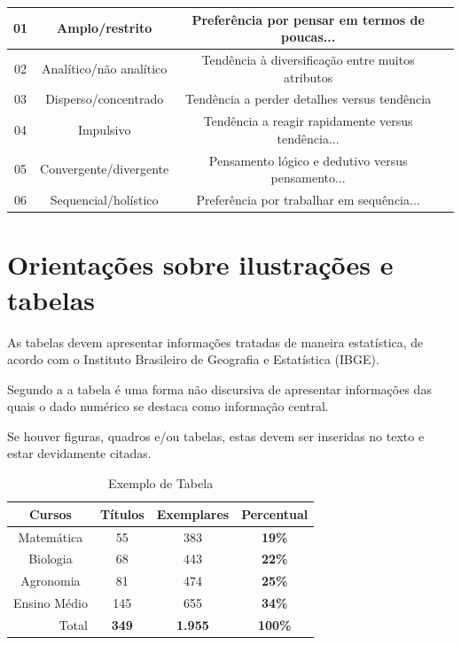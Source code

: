 \begin{quadro}[htb]

{
\caption{\label{quadro_exemplo}Estilos cognitivos propostos por psicólogos.}
}
 \begin{tabular}{|c|c|c|c|}

 \hline
 \rowcolor[HTML]{D2DFEC} 
 \textbf{01} & \textbf{Amplo/restrito} & \textbf{Preferência por pensar em termos de poucas...} \\
 \hline
 \rowcolor[HTML]{A7BDDE} 
 02 & Analítico/não analítico & Tendência à diversificação entre muitos atributos \\ \hline
 \rowcolor[HTML]{D2DFEC} 
 03 & Disperso/concentrado & Tendência a perder detalhes versus tendência \\ \hline
 \rowcolor[HTML]{A7BDDE}
 04 & Impulsivo & Tendência a reagir rapidamente versus tendência... \\ \hline
 \rowcolor[HTML]{D2DFEC} 
 05 & Convergente/divergente & Pensamento lógico e dedutivo versus pensamento... \\ \hline
 \rowcolor[HTML]{A7BDDE}
 06 & Sequencial/holístico & Preferência por trabalhar em sequência... \\ \hline
 \end{tabular}
  
\end{quadro}



\section{Orientações sobre ilustrações e tabelas}

As tabelas devem apresentar informações tratadas de maneira estatística, de acordo com o Instituto Brasileiro de Geografia e Estatística (IBGE).

Segundo a  a tabela é uma forma não discursiva de apresentar informações das quais o dado numérico se destaca como informação central.

Se houver figuras, quadros e/ou tabelas, estas devem ser inseridas no texto e estar devidamente citadas.

\begin{table}[H]
\caption{\label{tabela_exemplo}Exemplo de Tabela}
\centering
\begin{tabular}{c|c|c|c}
\hline
\textbf{Cursos} & \cellcolor[HTML]{C0C0C0}\textbf{Títulos} & \textbf{Exemplares} & \textbf{Percentual} \\ \hline
\rowcolor[HTML]{C0C0C0} 
Matemática & 55 & 383 & \textbf{19\%} \\ \hline
Biologia & \cellcolor[HTML]{C0C0C0}68 & 443 & \textbf{22\%} \\ \hline
\rowcolor[HTML]{C0C0C0} 
Agronomia & 81 & 474 & \textbf{25\%} \\ \hline
Ensino Médio & \cellcolor[HTML]{C0C0C0}145 & 655 & \textbf{34\%} \\ \hline
\multicolumn{1}{r}{Total} & \cellcolor[HTML]{C0C0C0}\textbf{349} & \textbf{1.955} & \textbf{100\%} \\ \hline
\end{tabular}
\end{table}


